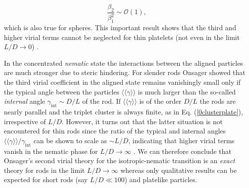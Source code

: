 \begin{equation}
\frac{\beta_{2}}{\beta_{1}^{2}}\sim \mathcal{O}(1), \label{0clusterplate}
\end{equation}
which is also true for spheres. This important result shows that the third and higher virial terms cannot be neglected for thin platelets (not even in the limit $L/D\rightarrow 0$) \cite{Veerman}.

In the concentrated {\em nematic} state the interactions between the aligned particles are much stronger due to steric hindering. For slender rods Onsager showed that the third virial coefficient in the aligned state remains vanishingly small  only if the typical angle between the particles $\langle\langle \gamma \rangle\rangle $ is much larger than the so-called {\em internal} angle $\gamma_{\text{int}}\sim D/L$ of the rod. If $\langle\langle \gamma \rangle\rangle$ is of the order $D/L$ the rods are nearly parallel and the triplet cluster is always finite, as in Eq. (\ref{0clusterplate}), irrespective of $L/D$. However, it turns out that the latter situation is not encountered for thin rods since the ratio of the typical and internal angles $\langle\langle \gamma \rangle\rangle /\gamma_{\text{int}}$  can be shown to scale as $\sim L/D$, indicating that higher virial terms vanish in the nematic phase  for $L/D\rightarrow \infty$ \cite{Vroege92}. We can therefore conclude that  Onsager's  second virial theory for the isotropic-nematic transition is an {\em exact} theory for rods in the limit $L/D \rightarrow \infty$ whereas  only qualitative results can be expected for short rods (say $L/D\ll 100$) and  platelike particles.

